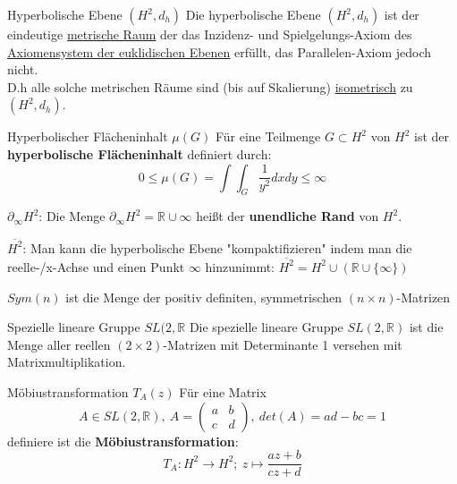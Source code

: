 \begin{titleDef}{Hyperbolische Ebene $(H^2,d_h)$}
Die hyperbolische Ebene $(H^2,d_h)$ ist der eindeutige \hyperref[MetrischerRaum]{metrische Raum} der das Inzidenz- und Spielgelungs-Axiom des \hyperref[axiomPlane]{Axiomensystem der euklidischen Ebenen} erfüllt, das Parallelen-Axiom jedoch nicht.\\
D.h alle solche metrischen Räume sind (bis auf Skalierung) \hyperref[Isometrie]{isometrisch} zu $(H^2,d_h)$.
\end{titleDef}

\begin{titleDef}{Hyperbolischer Flächeninhalt $\mu(G)$}
Für eine Teilmenge $G\subset H^2$ von $H^2$ ist der \textbf{hyperbolische Flächeninhalt} definiert durch:
$$0\leq\mu(G)=\int\int_{G}\frac{1}{y^2}dxdy\leq\infty$$
\end{titleDef}

\begin{rawDef}
$\partial_\infty H^2$: Die Menge $\partial_\infty H^2=\mathbb{R}\cup\infty$ heißt der \textbf{unendliche Rand} von $H^2$.
\end{rawDef}

\begin{rawDef}
$\overline{H^2}$: Man kann die hyperbolische Ebene "kompaktifizieren" indem man die reelle-/x-Achse und einen Punkt $\infty$ hinzunimmt: $\overline{H^2}=H^2\cup(\mathbb{R}\cup\{\infty\})$
\end{rawDef}

\begin{rawDef}
$Sym(n)$ ist die Menge der positiv definiten, symmetrischen $(n\times n)$-Matrizen	
\end{rawDef}

\begin{titleDef}{Spezielle lineare Gruppe $SL(2,\mathbb{R}$}
\label{spezielllinGruppe}
Die spezielle lineare Gruppe $SL(2,\mathbb{R})$ ist die Menge aller reellen $(2\times 2)$-Matrizen mit Determinante 1 versehen mit Matrixmultiplikation.
\end{titleDef}

\begin{titleDef}{Möbiustransformation $T_A(z)$}
Für eine Matrix $$A\in SL(2,\mathbb{R}),\: A=\begin{pmatrix}
	a&b\\c&d
\end{pmatrix},\: det(A)=ad-bc=1$$
definiere ist die \textbf{Möbiustransformation}:
$$T_A:H^2\to H^2;\: z\mapsto\frac{az+b}{cz+d}$$
\end{titleDef}

